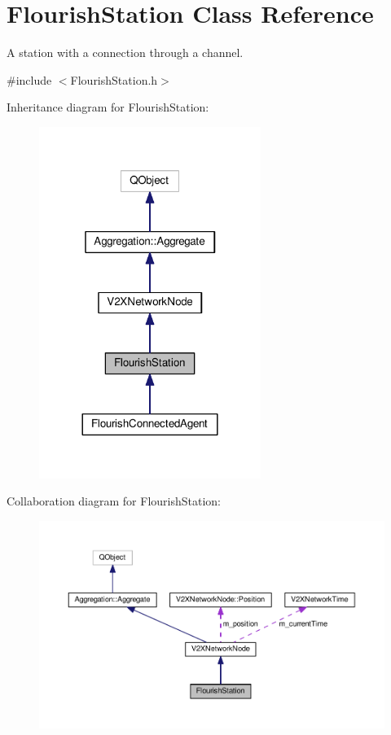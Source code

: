 \hypertarget{classFlourishStation}{}\section{Flourish\+Station Class Reference}
\label{classFlourishStation}


A station with a connection through a channel.  




{\ttfamily \#include $<$Flourish\+Station.\+h$>$}



Inheritance diagram for Flourish\+Station\+:
\nopagebreak
\begin{figure}[H]
\begin{center}
\leavevmode
\includegraphics[width=204pt]{classFlourishStation__inherit__graph}
\end{center}
\end{figure}


Collaboration diagram for Flourish\+Station\+:
\nopagebreak
\begin{figure}[H]
\begin{center}
\leavevmode
\includegraphics[width=350pt]{classFlourishStation__coll__graph}
\end{center}
\end{figure}
